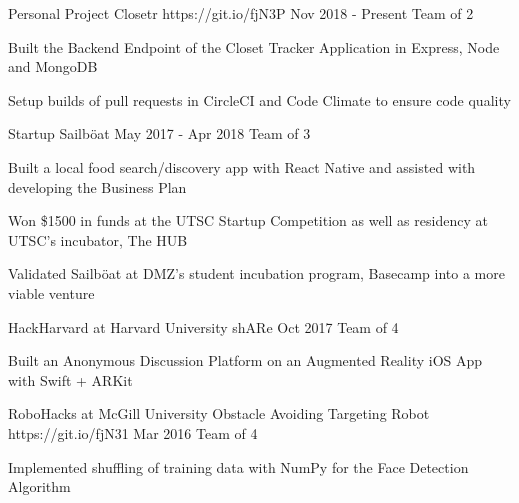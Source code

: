 \begin{cventries}
\cventry
    {Personal Project}
    {Closetr}
    {https://git.io/fjN3P}
    {Nov 2018 - Present}
    {Team of 2}
    {
      \begin{cvitems}
        \item{Built the Backend Endpoint of the Closet Tracker Application in Express, Node and MongoDB}
        \item{Setup builds of pull requests in CircleCI and Code Climate to ensure code quality}
      \end{cvitems}
    }
\cventry
  {Startup}
  {Sailböat}
  {}
  {May 2017 - Apr 2018}
  {Team of 3}
  {
    \begin{cvitems}
      \item {Built a local food search/discovery app with React Native and assisted with developing the Business Plan}
      \item {Won \$1500 in funds at the UTSC Startup Competition as well as residency at UTSC's incubator, The HUB}
      \item {Validated Sailböat at DMZ's student incubation program, Basecamp into a more viable venture}
    \end{cvitems}
  }
\cventry
  {HackHarvard at Harvard University}
  {shARe}
  {}
  {Oct 2017}
  {Team of 4}
  {
    \begin{cvitems}
      \item {Built an Anonymous Discussion Platform on an Augmented Reality iOS App with Swift + ARKit}
    \end{cvitems}
  }
\cventry
  {RoboHacks at McGill University}
  {Obstacle Avoiding Targeting Robot}
  {https://git.io/fjN31}
  {Mar 2016}
  {Team of 4}
  {
    \begin{cvitems}
      \item {Implemented shuffling of training data with NumPy for the Face Detection Algorithm}
    \end{cvitems}
  }
\end{cventries}
